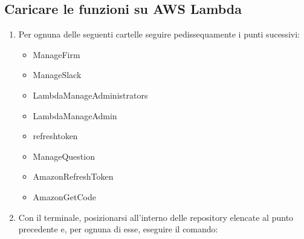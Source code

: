 \documentclass[../ManualeSviluppatore_v1.0.0.tex]{subfiles}
\begin{document}
	\subsection{Caricare le funzioni su AWS Lambda}
		\begin{enumerate}
			\item Per ognuna delle seguenti cartelle seguire pedissequamente i punti sucessivi:
				\begin{itemize}
				\item ManageFirm
				\item ManageSlack
				\item LambdaManageAdministrators
				\item LambdaManageAdmin
				\item refreshtoken
				\item ManageQuestion
				\item AmazonRefreshToken
				\item AmazonGetCode
				\end{itemize}

			\item Con il terminale, posizionarsi all'interno delle repository elencate al punto precedente e, per ognuna di esse, eseguire il comando:
			\begin{center}

\end{center}
\end{enumerate}
\end{document}
